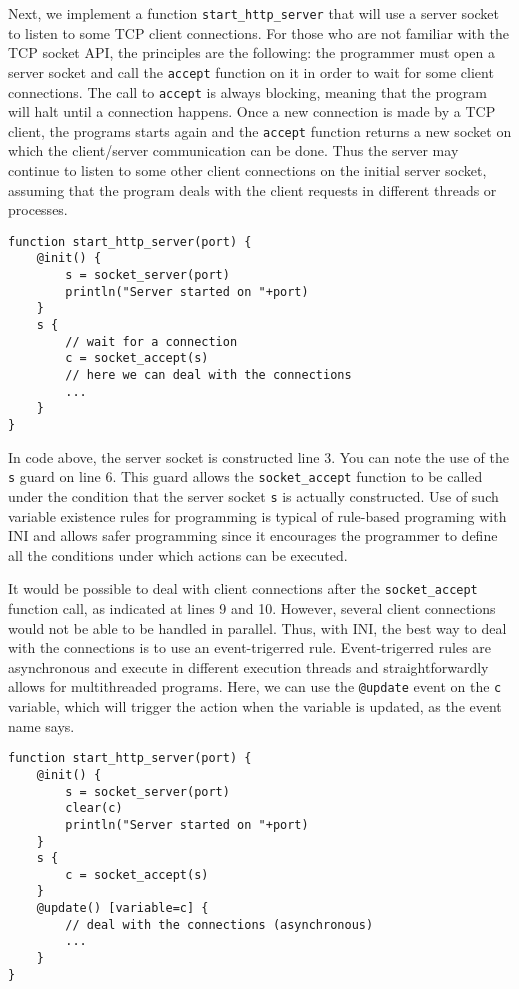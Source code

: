 \documentclass[11pt]{report}
\begin{document}
Next, we implement a function \texttt{start\_http\_server} that will use a server socket to listen to some TCP client connections. For those who are not familiar with the TCP socket API, the principles are the following: the programmer must open a server socket and call the \texttt{accept} function on it in order to wait for some client connections. The call to \texttt{accept} is always blocking, meaning that the program will halt until a connection happens. Once a new connection is made by a TCP client, the programs starts again and the \texttt{accept} function returns a  new socket on which the client/server communication can be done. Thus the server may continue to listen to some other client connections on the initial server socket, assuming that the program deals with the client requests in different threads or processes.

\begin{lstlisting}
function start_http_server(port) {
	@init() {
		s = socket_server(port)
		println("Server started on "+port)
	}
	s {
		// wait for a connection
		c = socket_accept(s)
		// here we can deal with the connections
		...
	}
}
\end{lstlisting}

In code above, the server socket is constructed line 3. You can note the use of the \texttt{s} guard on line 6. This guard allows the \texttt{socket\_accept} function to be called under the condition that the server socket \texttt{s} is actually constructed. Use of such variable existence rules for programming is typical of rule-based programing with INI and allows safer programming since it encourages the programmer to define all the conditions under which actions can be executed.

It would be possible to deal with client connections after the \texttt{socket\_accept} function call, as indicated at lines 9 and 10. However, several client connections would not be able to be handled in parallel. Thus, with INI, the best way to deal with the connections is to use an event-trigerred rule. Event-trigerred rules are asynchronous and execute in different execution threads and straightforwardly allows for multithreaded programs. Here, we can use the \texttt{@update} event on the \texttt{c} variable, which will trigger the action when the variable is updated, as the event name says.

\begin{lstlisting}
function start_http_server(port) {
	@init() {
		s = socket_server(port)
		clear(c)
		println("Server started on "+port)
	}
	s {
		c = socket_accept(s)
	}
	@update() [variable=c] {
		// deal with the connections (asynchronous)
		...
	}
}
\end{lstlisting}
\end{document}
